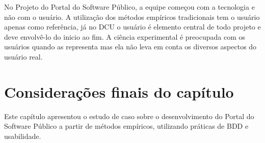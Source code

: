 No Projeto do Portal do Software Público, a equipe começou com a tecnologia e não com o usuário. A utilização dos métodos empíricos tradicionais tem o usuário apenas como referência, já no DCU o usuário é elemento central de todo projeto e deve envolvê-lo do inicio ao fim. A ciência experimental é preocupada com os usuários quando as representa mas ela não leva em conta os diversos aspectos do usuário real.
	

\section{Considerações finais do capítulo}

Este capítulo apresentou o estudo de caso sobre o desenvolvimento do Portal do Software Público a partir de métodos empíricos, utilizando práticas de BDD e usabilidade.







